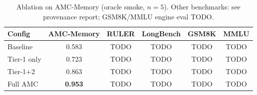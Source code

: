\begin{table}[t]
\centering
\caption{Ablation on AMC-Memory (oracle smoke, $n{=}5$).
Other benchmarks: see provenance report; GSM8K/MMLU engine eval TODO.}
\label{tab:ablation}
\begin{tabular}{lccccc}
\toprule
Config & AMC-Memory & RULER & LongBench & GSM8K & MMLU \\
\midrule
Baseline    & 0.583 & TODO & TODO & TODO & TODO \\
Tier-1 only & 0.723 & TODO & TODO & TODO & TODO \\
Tier-1+2    & 0.863 & TODO & TODO & TODO & TODO \\
Full AMC    & \textbf{0.953} & TODO & TODO & TODO & TODO \\
\bottomrule
\end{tabular}
\end{table}
